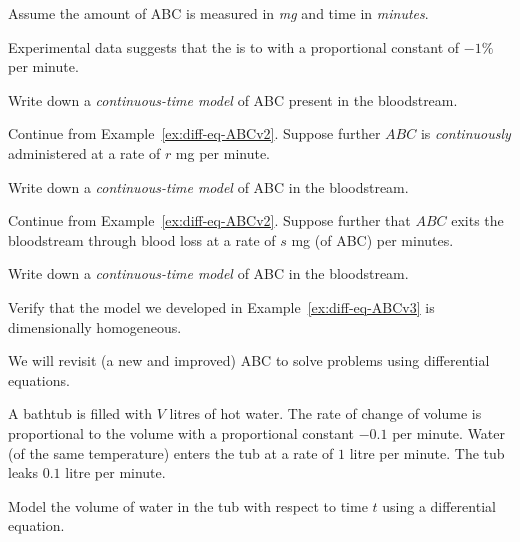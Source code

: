 \documentclass[../main.tex]{subfiles}
\begin{document}
Assume the amount of ABC is measured in \emph{mg} and time in \emph{minutes}.

\begin{example} \label{ex:diff-eq-ABCv1}
  Experimental data suggests that the  is  to  with a proportional constant of \(-1\%\) per minute.

  Write down a \emph{continuous-time model} of ABC present in the bloodstream.
\end{example}

\begin{example} \label{ex:diff-eq-ABCv2}
  Continue from Example~\ref{ex:diff-eq-ABCv2}.  Suppose further \(ABC\) is \emph{continuously} administered at a rate of \(r\) mg per minute. 

  Write down a \emph{continuous-time model} of ABC in the bloodstream.
\end{example}

\begin{example} \label{ex:diff-eq-ABCv3}
  Continue from Example~\ref{ex:diff-eq-ABCv2}.  Suppose further that \(ABC\) exits the bloodstream through blood loss at a rate of \(s\) mg (of ABC) per minutes. 

  Write down a \emph{continuous-time model} of ABC in the bloodstream.
\end{example}

\begin{example}
  Verify that the model we developed in Example~\ref{ex:diff-eq-ABCv3} is dimensionally homogeneous.
\end{example}

We will revisit (a new and improved) ABC to solve problems using differential equations.
\clearpage

\begin{example}
  A bathtub is filled with \(V\) litres of hot water. The rate of change of volume is proportional to the volume with a proportional constant \(-0.1\) per minute.  Water (of the same temperature) enters the tub at a rate of \(1\) litre per minute. The tub leaks \(0.1\) litre per minute. 

  Model the volume of water in the tub with respect to time \(t\) using a differential equation.

\end{example}
\end{document}
